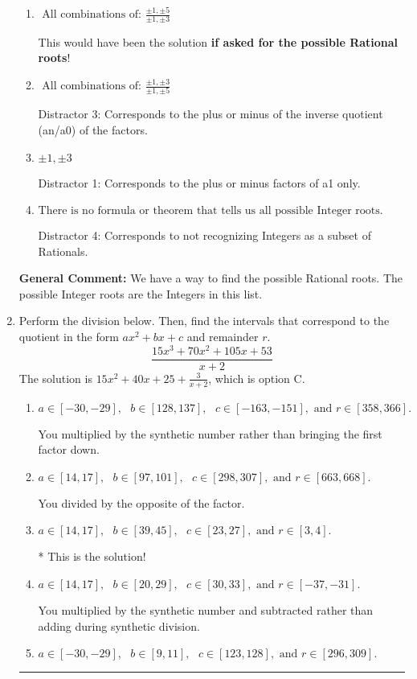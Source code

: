 \documentclass{extbook}[14pt]
\newcommand{\litem}[1]{\item #1

\rule{\textwidth}{0.4pt}}
\begin{document}
\begin{enumerate}
{\begin{enumerate}[label=\Alph*.]
* This is the solution \textbf{since we asked for the possible Integer roots}!
\item \( \text{ All combinations of: }\frac{\pm 1,\pm 5}{\pm 1,\pm 3} \)

This would have been the solution \textbf{if asked for the possible Rational roots}!
\item \( \text{ All combinations of: }\frac{\pm 1,\pm 3}{\pm 1,\pm 5} \)

 Distractor 3: Corresponds to the plus or minus of the inverse quotient (an/a0) of the factors. 
\item \( \pm 1,\pm 3 \)

 Distractor 1: Corresponds to the plus or minus factors of a1 only.
\item \( \text{There is no formula or theorem that tells us all possible Integer roots.} \)

 Distractor 4: Corresponds to not recognizing Integers as a subset of Rationals.
\end{enumerate}

\textbf{General Comment:} We have a way to find the possible Rational roots. The possible Integer roots are the Integers in this list.
}
\litem{
Perform the division below. Then, find the intervals that correspond to the quotient in the form $ax^2+bx+c$ and remainder $r$.
\[ \frac{15x^{3} +70 x^{2} +105 x + 53}{x + 2} \]The solution is \( 15x^{2} +40 x + 25 + \frac{3}{x + 2} \), which is option C.\begin{enumerate}[label=\Alph*.]
\item \( a \in [-30, -29], \text{   } b \in [128, 137], \text{   } c \in [-163, -151], \text{   and   } r \in [358, 366]. \)

 You multiplied by the synthetic number rather than bringing the first factor down.
\item \( a \in [14, 17], \text{   } b \in [97, 101], \text{   } c \in [298, 307], \text{   and   } r \in [663, 668]. \)

 You divided by the opposite of the factor.
\item \( a \in [14, 17], \text{   } b \in [39, 45], \text{   } c \in [23, 27], \text{   and   } r \in [3, 4]. \)

* This is the solution!
\item \( a \in [14, 17], \text{   } b \in [20, 29], \text{   } c \in [30, 33], \text{   and   } r \in [-37, -31]. \)

 You multiplied by the synthetic number and subtracted rather than adding during synthetic division.
\item \( a \in [-30, -29], \text{   } b \in [9, 11], \text{   } c \in [123, 128], \text{   and   } r \in [296, 309]. \)


\end{enumerate}}
\end{enumerate}
\end{document}
